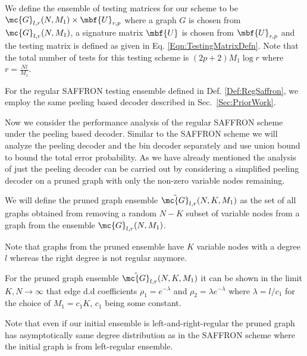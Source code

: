 \documentclass[conference,twocolumn]{IEEEtran}
\begin{document}
\begin{definition}
\label{Def:RegSaffron}
We define the ensemble of testing matrices for our scheme to be $\mc{G}_{l,r}(N,M_1)\times \mbf{U}_{r,p}$ where a graph $G$ is chosen from $\mc{G}_{l,r}(N,M_1)$, a signature matrix $\mbf{U}$ is chosen from $\mbf{U}_{r,p}$ and the testing matrix is defined as given in Eq. \eqref{Eqn:TestingMatrixDefn}. Note that the total number of tests for this testing scheme is $(2p+2)M_1\log r$ where $r=\frac{Nl}{M_1}$.
\end{definition}

For the regular SAFFRON testing ensemble defined in Def. \ref{Def:RegSaffron}, we employ the same peeling based decoder described in Sec.~\ref{Sec:PriorWork}. 

Now we consider the performance analysis of the regular SAFFRON scheme under the peeling based decoder. Similar to the SAFFRON scheme we will analyze the peeling decoder and the bin decoder separately and use union bound to bound the total error probability. As we have already  mentioned the analysis of just the peeling decoder can be carried out by considering a simplified peeling decoder on a pruned graph with only the non-zero variable nodes remaining. 

\begin{definition}
We will define the pruned graph ensemble $\tilde{\mc{G}}_{l,r}(N,K,M_1)$ as the set of all graphs obtained from removing a random $N-K$ subset of variable nodes from a graph from the ensemble $\mc{G}_{l,r}(N,M_1)$.
\end{definition}

Note that graphs from the pruned ensemble have $K$ variable nodes with a degree $l$ whereas the right degree is not regular anymore. 

\begin{lemma}
\label{Lem:EdgeDDPrunedGraph}
For the pruned graph ensemble $\tilde{\mc{G}}_{l,r}(N,K,M_1)$ it can be shown in the limit $K,N\rightarrow\infty$ that edge d.d coefficients $\rho_{1}=e^{-\lambda}$ and $\rho_{2}=\lambda e^{-\lambda}$ where $\lambda=l/c_1$ for the choice of $M_1=c_1K$, $c_1$ being some constant.
\end{lemma}

Note that even if our initial ensemble is left-and-right-regular the pruned graph has asymptotically same degree distribution as in the SAFFRON scheme where the initial graph is from left-regular ensemble.
\end{document}
